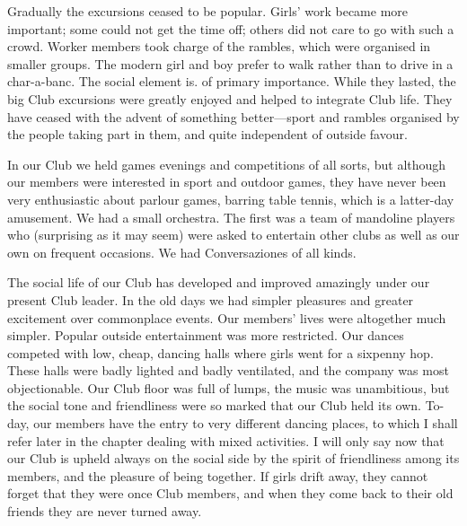 Gradually the excursions ceased to be popular. Girls’
work became more important; some could not get the
time off; others did not care to go with such a crowd.
Worker members took charge of the rambles, which were
organised in smaller groups. The modern girl and boy
prefer to walk rather than to drive in a char-a-banc. The
social element is. of primary importance. While they
lasted, the big Club excursions were greatly enjoyed and
helped to integrate Club life. They have ceased with the
advent of something better—sport and rambles organised
by the people taking part in them, and quite independent
of outside favour.

In our Club we held games evenings and competitions
of all sorts, but although our members were interested in
sport and outdoor games, they have never been very
enthusiastic about parlour games, barring table tennis,
which is a latter-day amusement. We had a small
orchestra. The first was a team of mandoline players
who (surprising as it may seem) were asked to entertain
other clubs as well as our own on frequent occasions. We
had Conversaziones of all kinds.

The social life of our Club has developed and improved
amazingly under our present Club leader. In the old days
we had simpler pleasures and greater excitement over
commonplace events. Our members’ lives were altogether
much simpler. Popular outside entertainment was more
restricted. Our dances competed with low, cheap, dancing
halls where girls went for a sixpenny hop. These
halls were badly lighted and badly ventilated, and the
company was most objectionable. Our Club floor was
full of lumps, the music was unambitious, but the social
tone and friendliness were so marked that our Club held
its own. To-day, our members have the entry to very
different dancing places, to which I shall refer later in
the chapter dealing with mixed activities. I will only
say now that our Club is upheld always on the social
side by the spirit of friendliness among its members, and
the pleasure of being together. If girls drift away, they
cannot forget that they were once Club members, and
when they come back to their old friends they are never
turned away.
